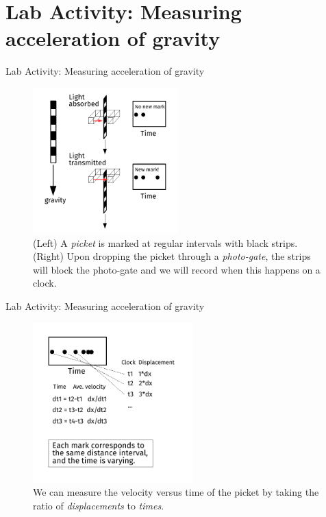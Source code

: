 \documentclass{beamer}
\begin{document}
\section{Lab Activity: Measuring acceleration of gravity}

\begin{frame}{Lab Activity: Measuring acceleration of gravity}
\small
\begin{figure}
\centering
\includegraphics[width=0.5\textwidth]{figures/PicketG.pdf}
\caption{\label{fig:picket} (Left) A \textit{picket} is marked at regular intervals with black strips.  (Right) Upon dropping the picket through a \textit{photo-gate}, the strips will block the photo-gate and we will record when this happens on a clock.}
\end{figure}
\end{frame}

\begin{frame}{Lab Activity: Measuring acceleration of gravity}
\small
\begin{figure}
\centering
\includegraphics[width=0.55\textwidth]{figures/PicketG2.pdf}
\caption{\label{fig:picket2} We can measure the velocity versus time of the picket by taking the ratio of \textit{displacements} to \textit{times}.}
\end{figure}
\end{frame}
\end{document}

